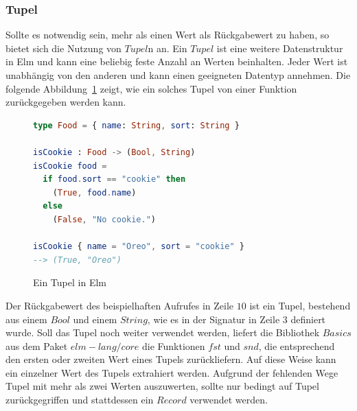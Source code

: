 \subsubsection{Tupel}
\label{sec:Tupel}
Sollte es notwendig sein, mehr als einen Wert als Rückgabewert zu haben, so bietet sich die Nutzung von $Tupel$n an. Ein $Tupel$ ist eine weitere Datenstruktur in Elm und kann eine beliebig feste Anzahl an Werten beinhalten. Jeder Wert ist unabhängig von den anderen und kann einen geeigneten Datentyp annehmen. Die folgende Abbildung~\ref{fig:elm-tupel} zeigt, wie ein solches Tupel von einer Funktion zurückgegeben werden kann.
\begin{figure}[h]
\begin{lstlisting}[language=Elm]
type Food = { name: String, sort: String }

isCookie : Food -> (Bool, String)
isCookie food =
  if food.sort == "cookie" then
    (True, food.name)
  else
    (False, "No cookie.")

isCookie { name = "Oreo", sort = "cookie" }
--> (True, "Oreo")
\end{lstlisting}
\caption{Ein Tupel in Elm}\label{fig:elm-tupel}
\end{figure}
Der Rückgabewert des beispielhaften Aufrufes in Zeile $10$ ist ein Tupel, bestehend aus einem $Bool$ und einem $String$, wie es in der Signatur in Zeile $3$ definiert wurde. Soll das Tupel noch weiter verwendet werden, liefert die Bibliothek $Basics$ aus dem Paket $elm-lang/core$ die Funktionen $fst$ und $snd$, die entsprechend den ersten oder zweiten Wert eines Tupels zurückliefern. Auf diese Weise kann ein einzelner Wert des Tupels extrahiert werden. Aufgrund der fehlenden Wege Tupel mit mehr als zwei Werten auszuwerten, sollte nur bedingt auf Tupel zurückgegriffen und stattdessen ein $Record$ verwendet werden.

